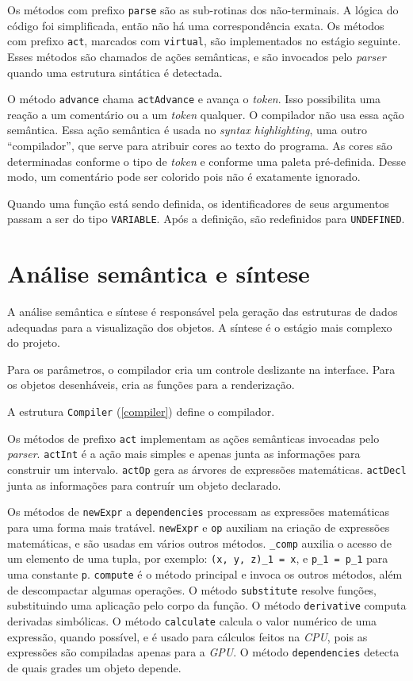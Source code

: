 Os métodos com prefixo \texttt{parse} são as sub-rotinas dos não-terminais.
A lógica do código foi simplificada, então não há uma correspondência exata.
Os métodos com prefixo \texttt{act}, marcados com \texttt{virtual},
são implementados no estágio seguinte.
Esses métodos são chamados de ações semânticas,
e são invocados pelo \textit{parser} quando uma estrutura sintática é detectada.

O método \texttt{advance} chama \texttt{actAdvance} e avança o \textit{token}.
Isso possibilita uma reação a um comentário ou a um \textit{token} qualquer.
O compilador não usa essa ação semântica.
Essa ação semântica é usada no \textit{syntax highlighting},
uma outro ``compilador'', que serve para atribuir cores ao texto do programa.
As cores são determinadas conforme o tipo de \textit{token} e conforme uma 
paleta pré-definida.
Desse modo, um comentário pode ser colorido pois não é exatamente ignorado.

Quando uma função está sendo definida, os identificadores de seus argumentos
passam a ser do tipo \texttt{VARIABLE}.
Após a definição, são redefinidos para \texttt{UNDEFINED}.

\section{Análise semântica e síntese}
A análise semântica e síntese é responsável pela geração das estruturas de dados
adequadas para a visualização dos objetos.
A síntese é o estágio mais complexo do projeto.

Para os parâmetros, o compilador cria um controle deslizante na interface.
Para os objetos desenháveis, cria as funções para a renderização.

\newpage
A estrutura \texttt{Compiler} (\ref{compiler}) define o compilador.

\lstset{language=c++}

Os métodos de prefixo \texttt{act} implementam as
ações semânticas invocadas pelo \textit{parser}.
\texttt{actInt} é a ação mais simples e apenas junta as informações
para construir um intervalo.
\texttt{actOp} gera as árvores de expressões matemáticas.
\texttt{actDecl} junta as informações para contruír um objeto declarado.

Os métodos de \texttt{newExpr} a \texttt{dependencies} processam
as expressões matemáticas para uma forma mais tratável.
\texttt{newExpr} e \texttt{op} auxiliam na criação de expressões matemáticas, e são usadas
em vários outros métodos.
\texttt{\_comp} auxilia o acesso de um elemento de uma tupla, por exemplo:
\texttt{(x, y, z)\_1 = x}, e \texttt{p\_1 = p\_1} para uma constante \texttt{p}.
\texttt{compute} é o método principal e invoca os outros métodos, além de
descompactar algumas operações.
O método \texttt{substitute} resolve funções, substituindo uma aplicação pelo corpo da função.
O método \texttt{derivative} computa derivadas simbólicas.
O método \texttt{calculate} calcula o valor numérico de uma expressão, 
quando possível, e é usado para cálculos feitos na \textit{CPU}, pois
as expressões são compiladas apenas para a \textit{GPU}.
O método \texttt{dependencies} detecta de quais grades um objeto depende.

